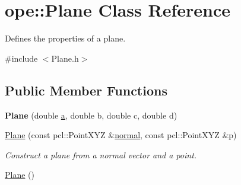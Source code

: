 \hypertarget{classope_1_1_plane}{\section{ope\-:\-:Plane Class Reference}
\label{classope_1_1_plane}
}


Defines the properties of a plane.  




{\ttfamily \#include $<$Plane.\-h$>$}

\subsection*{Public Member Functions}
\begin{DoxyCompactItemize}
\item 
\hypertarget{classope_1_1_plane_aa2dec035114f64d9f4e50827f9540c54}{{\bfseries Plane} (double \hyperlink{classope_1_1_plane_a8cbbbc52cb37c0e2958baad8d2916814}{a}, double b, double c, double d)}\label{classope_1_1_plane_aa2dec035114f64d9f4e50827f9540c54}

\item 
\hypertarget{classope_1_1_plane_a88dc981fe5bf4ef8bf574548d947d796}{\hyperlink{classope_1_1_plane_a88dc981fe5bf4ef8bf574548d947d796}{Plane} (const pcl\-::\-Point\-X\-Y\-Z \&\hyperlink{classope_1_1_plane_a8917005ae532501280c87222dfccd140}{normal}, const pcl\-::\-Point\-X\-Y\-Z \&p)}\label{classope_1_1_plane_a88dc981fe5bf4ef8bf574548d947d796}

\begin{DoxyCompactList}\small\item\em Construct a plane from a normal vector and a point. \end{DoxyCompactList}\item 
\hypertarget{classope_1_1_plane_aee9ace21e6040684f05510b69948e68a}{\hyperlink{classope_1_1_plane_aee9ace21e6040684f05510b69948e68a}{Plane} ()}\label{classope_1_1_plane_aee9ace21e6040684f05510b69948e68a}


\end{DoxyCompactItemize}
